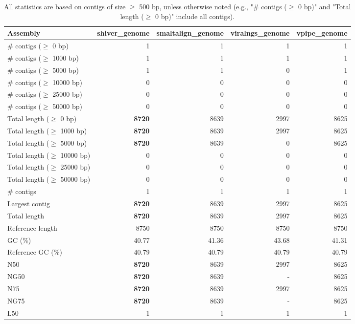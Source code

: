 \documentclass[12pt,a4paper]{article}
\begin{document}
\begin{table}[ht]
\begin{center}
\caption{All statistics are based on contigs of size $\geq$ 500 bp, unless otherwise noted (e.g., "\# contigs ($\geq$ 0 bp)" and "Total length ($\geq$ 0 bp)" include all contigs).}
\begin{tabular}{|l*{4}{|r}|}
\hline
Assembly & shiver\_genome & smaltalign\_genome & viralngs\_genome & vpipe\_genome \\ \hline
\# contigs ($\geq$ 0 bp) & 1 & 1 & 1 & 1 \\ \hline
\# contigs ($\geq$ 1000 bp) & 1 & 1 & 1 & 1 \\ \hline
\# contigs ($\geq$ 5000 bp) & 1 & 1 & 0 & 1 \\ \hline
\# contigs ($\geq$ 10000 bp) & 0 & 0 & 0 & 0 \\ \hline
\# contigs ($\geq$ 25000 bp) & 0 & 0 & 0 & 0 \\ \hline
\# contigs ($\geq$ 50000 bp) & 0 & 0 & 0 & 0 \\ \hline
Total length ($\geq$ 0 bp) & {\bf 8720} & 8639 & 2997 & 8625 \\ \hline
Total length ($\geq$ 1000 bp) & {\bf 8720} & 8639 & 2997 & 8625 \\ \hline
Total length ($\geq$ 5000 bp) & {\bf 8720} & 8639 & 0 & 8625 \\ \hline
Total length ($\geq$ 10000 bp) & 0 & 0 & 0 & 0 \\ \hline
Total length ($\geq$ 25000 bp) & 0 & 0 & 0 & 0 \\ \hline
Total length ($\geq$ 50000 bp) & 0 & 0 & 0 & 0 \\ \hline
\# contigs & 1 & 1 & 1 & 1 \\ \hline
Largest contig & {\bf 8720} & 8639 & 2997 & 8625 \\ \hline
Total length & {\bf 8720} & 8639 & 2997 & 8625 \\ \hline
Reference length & 8750 & 8750 & 8750 & 8750 \\ \hline
GC (\%) & 40.77 & 41.36 & 43.68 & 41.31 \\ \hline
Reference GC (\%) & 40.79 & 40.79 & 40.79 & 40.79 \\ \hline
N50 & {\bf 8720} & 8639 & 2997 & 8625 \\ \hline
NG50 & {\bf 8720} & 8639 & - & 8625 \\ \hline
N75 & {\bf 8720} & 8639 & 2997 & 8625 \\ \hline
NG75 & {\bf 8720} & 8639 & - & 8625 \\ \hline
L50 & 1 & 1 & 1 & 1 \\ \hline

\end{tabular}
\end{center}
\end{table}
\end{document}
